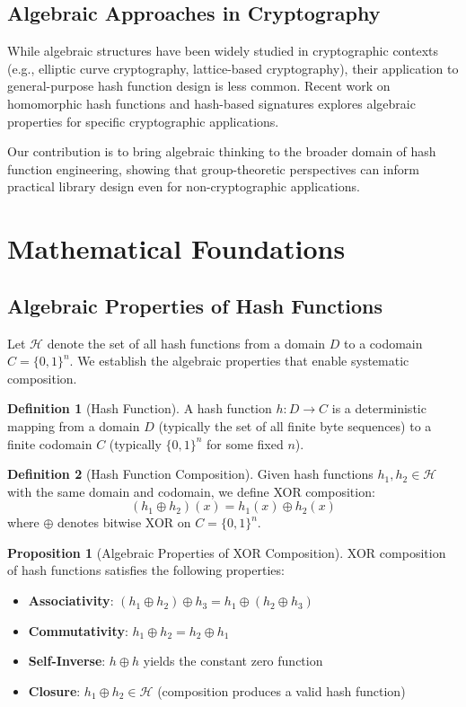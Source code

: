 \documentclass[11pt,a4paper]{article}
\theoremstyle{definition}
\newtheorem{definition}{Definition}[section]
\newtheorem{proposition}[theorem]{Proposition}
\begin{document}
\subsection{Algebraic Approaches in Cryptography}

While algebraic structures have been widely studied in cryptographic contexts (e.g., elliptic curve cryptography, lattice-based cryptography), their application to general-purpose hash function design is less common. Recent work on homomorphic hash functions and hash-based signatures explores algebraic properties for specific cryptographic applications.

Our contribution is to bring algebraic thinking to the broader domain of hash function engineering, showing that group-theoretic perspectives can inform practical library design even for non-cryptographic applications.

\section{Mathematical Foundations}

\subsection{Algebraic Properties of Hash Functions}

Let $\mathcal{H}$ denote the set of all hash functions from a domain $D$ to a codomain $C = \{0, 1\}^n$. We establish the algebraic properties that enable systematic composition.

\begin{definition}[Hash Function]
A hash function $h: D \rightarrow C$ is a deterministic mapping from a domain $D$ (typically the set of all finite byte sequences) to a finite codomain $C$ (typically $\{0, 1\}^n$ for some fixed $n$).
\end{definition}

\begin{definition}[Hash Function Composition]
Given hash functions $h_1, h_2 \in \mathcal{H}$ with the same domain and codomain, we define XOR composition:
$$
(h_1 \oplus h_2)(x) = h_1(x) \oplus h_2(x)
$$
where $\oplus$ denotes bitwise XOR on $C = \{0, 1\}^n$.
\end{definition}

\begin{proposition}[Algebraic Properties of XOR Composition]
XOR composition of hash functions satisfies the following properties:
\begin{itemize}
    \item \textbf{Associativity}: $(h_1 \oplus h_2) \oplus h_3 = h_1 \oplus (h_2 \oplus h_3)$
    \item \textbf{Commutativity}: $h_1 \oplus h_2 = h_2 \oplus h_1$
    \item \textbf{Self-Inverse}: $h \oplus h$ yields the constant zero function
    \item \textbf{Closure}: $h_1 \oplus h_2 \in \mathcal{H}$ (composition produces a valid hash function)
\end{itemize}
\end{proposition}
\end{document}
